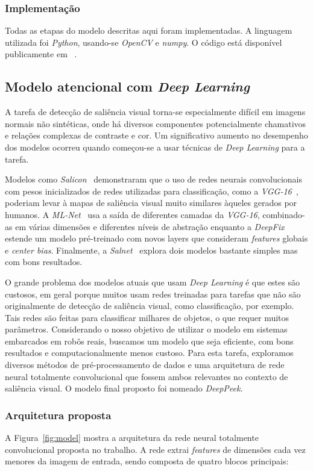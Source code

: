 \documentclass[11pt]{article}
\newcommand{\tit}[1]{\textit{#1}}
\begin{document}
\subsubsection{Implementação}
Todas as etapas do modelo descritas aqui foram implementadas.
A linguagem utilizada foi \tit{Python}, usando-se \tit{OpenCV} e \tit{numpy}.
O código está disponível publicamente em ~\cite{att}.

\subsection{Modelo atencional com \tit{Deep Learning}}
A tarefa de detecção de saliência visual torna-se especialmente difícil em
imagens normais não sintéticas, onde há diversos componentes potencialmente
chamativos e relações complexas de contraste e cor.
Um significativo aumento no desempenho dos modelos ocorreu quando começou-se
a usar técnicas de \tit{Deep Learning} para a tarefa.

Modelos como \emph{Salicon}~\cite{jiang_2015} demonstraram que o uso de redes
neurais convolucionais com
pesos inicializados de redes utilizadas para classificação, como a
\emph{VGG-16}~\cite{zisserman_2014},
poderiam levar à mapas de saliência visual muito similares àqueles
gerados por humanos.
A \emph{ML-Net}~\cite{cornia_2016} usa a saída de diferentes camadas da
\emph{VGG-16}, combinado-as em várias dimensões e diferentes níveis de
abstração enquanto a \emph{DeepFix}~\cite{kruthiventi_2015} estende um modelo pré-treinado com
novos layers que consideram \tit{features} globais e \tit{center bias}. Finalmente, 
a \emph{Salnet}~\cite{pan_2016} explora dois modelos bastante simples mas
com bons resultados.

O grande problema dos modelos atuais que usam \tit{Deep Learning} é que estes
são custosos, em geral porque muitos usam redes treinadas para tarefas que não
são originalmente de detecção de saliência visual, como classificação, por exemplo.
Tais redes são feitas para classificar milhares de objetos, o que requer
muitos parâmetros. Considerando o nosso objetivo de utilizar o modelo em sistemas embarcados em robôs reais, buscamos um modelo que seja eficiente, com bons resultados e computacionalmente menos custoso.
Para esta tarefa, exploramos diversos métodos de pré-processamento de dados
e uma arquitetura de rede neural totalmente convolucional que fossem ambos relevantes
no contexto de saliência visual. O modelo final proposto foi nomeado \tit{DeepPeek}.

\subsubsection{Arquitetura proposta}
A Figura~\ref{fig:model} mostra a arquitetura da rede neural totalmente
convolucional proposta no trabalho.
A rede extrai \tit{features} de dimensões cada vez menores da imagem de
entrada, sendo composta de quatro blocos principais:
\end{document}

